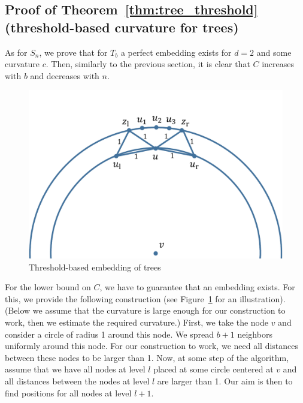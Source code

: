 \documentclass{article} %
\begin{document}
\subsection{Proof of Theorem~\ref{thm:tree_threshold} (threshold-based curvature for trees)}\label{app:tree_threshold}



As for $S_n$, we prove that for $T_b$ a perfect embedding exists for $d = 2$ and some curvature $c$. Then, similarly to the previous section, it is clear that $C$ increases with $b$ and decreases with $n$.


\begin{figure}
    \centering
    \includegraphics[width = 0.5 \textwidth]{trees.pdf}
    \caption{Threshold-based embedding of trees}
    \label{fig:trees}
\end{figure}


For the lower bound on $C$, we have to guarantee that an embedding exists. For this, we provide the following construction (see Figure~\ref{fig:trees} for an illustration).
(Below we assume that the curvature is large enough for our construction to work, then we estimate the required curvature.)
First, we take the node $v$ and consider a circle of radius 1 around this node. 
We spread $b + 1$ neighbors uniformly around this node. For our construction to work, we need all distances between these nodes to be larger than 1.
Now, at some step of the algorithm, assume that we have all nodes at level $l$ placed at some circle centered at $v$ and all distances between the nodes at level $l$ are larger than 1. Our aim is then to find positions for all nodes at level $l + 1$.
\end{document}
